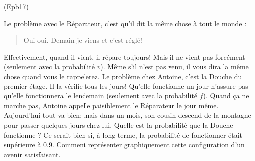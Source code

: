 \begin{tiny}(Epb17)\end{tiny} Le problème avec le Réparateur, c'est qu'il dit la même chose à tout le monde :
\begin{quotation}
  \og Oui oui. Demain je viens et c'est réglé!\fg
\end{quotation}
Effectivement, quand il vient, il répare toujours! Mais il ne vient pas forcément (seulement avec la probabilité $v$). Même s'il n'est pas venu, il vous dira la même chose quand vous le rappelerez.\newline
Le problème chez Antoine, c'est la Douche du premier étage. Il la vérifie tous les jours! Qu'elle fonctionne un jour n'assure pas qu'elle fonctionnera le lendemain (seulement avec la probabilité $f$). Quand ça ne marche pas, Antoine appelle paisiblement le Réparateur le jour même.\newline
Aujourd'hui tout va bien; mais dans un mois, son cousin descend de la montagne pour passer quelques jours chez lui. Quelle est la probabilité que la Douche fonctionne ? Ce serait bien si, à long terme, la probabilité de fonctionner était supérieure à $0.9$. Comment représenter graphiquement cette configuration d'un avenir satisfaisant.  
